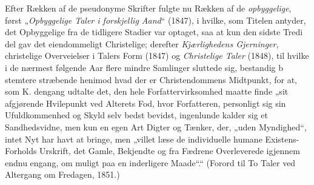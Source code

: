 \documentclass[12pt,a4paper]{book}
\begin{document}
Efter Rækken af de pseudonyme Skrifter fulgte nu Rækken af de \emph{opbyggelige}, først „\emph{Opbyggelige Taler i forskjellig Aand}“ (1847), i hvilke, som Titelen antyder, det Opbyggelige fra de tidligere Stadier var optaget, saa at kun den sidste Tredi del gav det eiendommeligt Christelige;
derefter \emph{Kjærlighedens Gjerninger}, christelige Overveielser i Talers Form (1847) og \emph{Christelige Taler} (1848), til hvilke i de nærmest følgende Aar flere mindre Samlinger sluttede sig, bestandig b stemtere stræbende henimod
hvad der er Christendommens Midtpunkt, for at, som K. dengang udtalte det, den hele Forfattervirksomhed maatte finde „sit afgjørende Hvilepunkt ved Alterets Fod, hvor Forfatteren, personligt sig sin Ufuldkommenhed og Skyld selv bedst bevidst, ingenlunde kalder sig et Sandhedsvidne, men kun en egen Art Digter og Tænker, der, „uden Myndighed“, intet Nyt har havt at bringe, men „villet læse de individuelle humane Existens-Forholds Urskrift, det Gamle, Bekjendte og fra Fædrene Overleverede igjennem endnu engang, om muligt paa en inderligere Maade“.“ (Forord til To Taler ved Altergang om Fredagen, 1851.)
\end{document}

